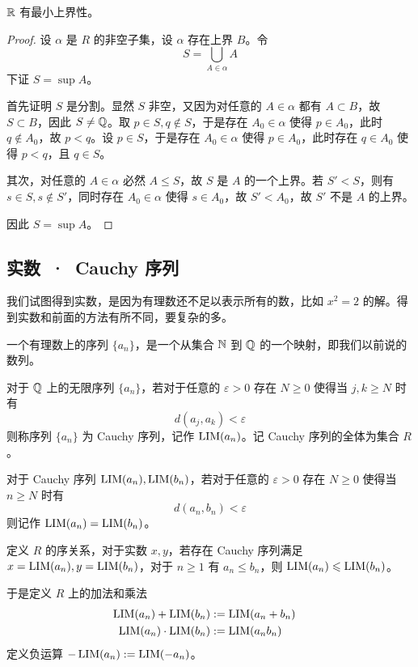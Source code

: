 \begin{theorem}
	$\mathbb{R}$ 有最小上界性。
\end{theorem}
\begin{proof}
	设 $\alpha$ 是 $R$ 的非空子集，设 $\alpha$ 存在上界 $B$。令
	$$S = \bigcup_{A \in \alpha} A$$
	下证 $S = \sup A$。

	首先证明 $S$ 是分割。显然 $S$ 非空，又因为对任意的 $A\in \alpha$ 都有 $A \subset B$，故 $S \subset B$，因此 $S \ne \mathbb{Q}$。取 $p \in S,q\notin S$，于是存在 $A_0 \in \alpha$ 使得 $p \in A_0$，此时 $q \notin A_0$，故 $p<q$。设 $p \in S$，于是存在 $A_0 \in \alpha$ 使得 $p \in A_0$，此时存在 $q\in A_0$ 使得 $p < q$，且 $q \in S$。

	其次，对任意的 $A \in \alpha$ 必然 $A \leqslant S$，故 $S$ 是 $A$ 的一个上界。若 $S' < S$，则有 $s \in S, s \notin S'$，同时存在 $A_0 \in \alpha$ 使得 $s \in A_0$，故 $S' < A_0$，故 $S'$ 不是 $A$ 的上界。

	因此 $S = \sup A$。
\end{proof}

\subsection{实数\ ·\ Cauchy 序列}

我们试图得到实数，是因为有理数还不足以表示所有的数，比如 $x^2=2$ 的解。得到实数和前面的方法有所不同，要复杂的多。

一个有理数上的序列 $\{a_n\}$，是一个从集合 $\mathbb{N}$ 到 $\mathbb{Q}$ 的一个映射，即我们以前说的数列。

对于 $\mathbb{Q}$ 上的无限序列 $\{a_n\}$，若对于任意的 $\varepsilon > 0$ 存在 $N \geqslant 0$ 使得当 $j,k \geqslant N$ 时有 
$$d(a_j,a_k) < \varepsilon$$
则称序列 $\{a_n\}$ 为 Cauchy 序列，记作 $\operatorname{{LIM}}(a_n)$。记 Cauchy 序列的全体为集合 $R$。

对于 Cauchy 序列 $\operatorname{{LIM}}(a_n),\operatorname{{LIM}}(b_n)$，若对于任意的 $\varepsilon > 0$ 存在 $N \geqslant 0$ 使得当 $n \geqslant N$ 时有
$$d(a_n,b_n) < \varepsilon$$
则记作 $\operatorname{{LIM}}(a_n) = \operatorname{{LIM}}(b_n)$。

定义 $R$ 的序关系，对于实数 $x,y$，若存在 Cauchy 序列满足 $x=\operatorname{{LIM}}(a_n),y=\operatorname{{LIM}}(b_n)$，对于 $n\geqslant 1$ 有 $a_n \leqslant b_n$，则 $\operatorname{{LIM}}(a_n) \leqslant \operatorname{{LIM}}(b_n)$。

于是定义 $R$ 上的加法和乘法
\begin{equation*}
	\begin{aligned}
		\operatorname{{LIM}}(a_n) + \operatorname{{LIM}}(b_n) &:= \operatorname{{LIM}}(a_n+b_n)&\\
		\operatorname{{LIM}}(a_n) \cdot \operatorname{{LIM}}(b_n) &:= \operatorname{{LIM}}(a_nb_n)\\
	\end{aligned}
\end{equation*}
定义负运算 $-\operatorname{{LIM}}(a_n) := \operatorname{{LIM}}(-a_n)$。

